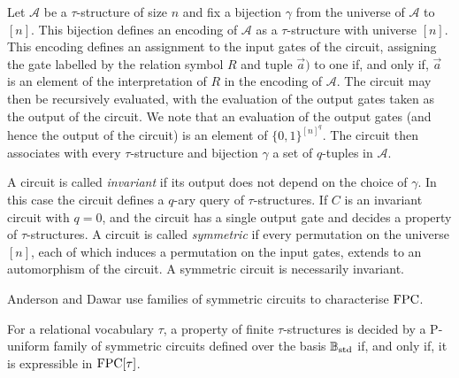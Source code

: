 \documentclass[../paper.tex]{subfiles}
\begin{document}
Let $\mathcal{A}$ be a $\tau$-structure of size $n$ and fix a bijection $\gamma$
from the universe of $\mathcal{A}$ to $[n]$. This bijection defines an encoding
of $\mathcal{A}$ as a $\tau$-structure with universe $[n]$. This encoding
defines an assignment to the input gates of the circuit, assigning the gate
labelled by the relation symbol $R$ and tuple $\vec{a})$ to one if, and only if,
$\vec{a}$ is an element of the interpretation of $R$ in the encoding of
$\mathcal{A}$. The circuit may then be recursively evaluated, with the
evaluation of the output gates taken as the output of the circuit. We note that
an evaluation of the output gates (and hence the output of the circuit) is an
element of $\{0,1\}^{[n]^q}$. The circuit then associates with every
$\tau$-structure and bijection $\gamma$ a set of $q$-tuples in $\mathcal{A}$.

A circuit is called \emph{invariant} if its output does not depend on the choice
of $\gamma$. In this case the circuit defines a $q$-ary query of
$\tau$-structures. If $C$ is an invariant circuit with $q = 0$, and the circuit
has a single output gate and decides a property of $\tau$-structures. A circuit
is called \emph{symmetric} if every permutation on the universe $[n]$, each of
which induces a permutation on the input gates, extends to an automorphism of
the circuit. A symmetric circuit is necessarily invariant.

Anderson and Dawar use families of symmetric circuits to characterise $\text{\upshape FPC}$.

\begin{thm}
  For a relational vocabulary $\tau$, a property of finite $\tau$-structures is
  decided by a P-uniform family of symmetric circuits defined over the basis
  $\mathbb{B}_{\text{std}}$ if, and only if, it is expressible in $\text{\upshape FPC}[\tau]$.
\end{thm}



\end{document}
